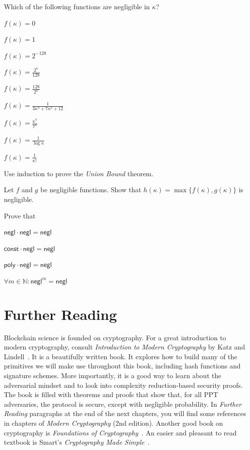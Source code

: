 \begin{problems}
  \item Which of the following functions are negligible in $\kappa$?
    \begin{subproblems}
      \item $f(\kappa) = 0$
      \item $f(\kappa) = 1$
      \item $f(\kappa) = 2^{-128}$
      \item $f(\kappa) = \frac{2^\kappa}{128}$
      \item $f(\kappa) = \frac{128}{2^\kappa}$
      \item $f(\kappa) = \frac{1}{3\kappa^3 + 7\kappa^2 + 12}$
      \item $f(\kappa) = \frac{\kappa^{7}}{7^{\kappa}}$
      \item $f(\kappa) = \frac{1}{\log \kappa}$
      \item $f(\kappa) = \frac{1}{\kappa!}$
    \end{subproblems}
  \item Use induction to prove the \emph{Union Bound} theorem.
  \item Let $f$ and $g$ be negligible functions. Show that $h(\kappa) = \max\{f(\kappa), g(\kappa)\}$
        is negligible.
  \item Prove that
    \begin{subproblems}
      \item $\textsf{negl} \cdot \textsf{negl} = \textsf{negl}$
      \item $\textsf{const} \cdot \textsf{negl} = \textsf{negl}$
      \item $\textsf{poly} \cdot \textsf{negl} = \textsf{negl}$
      \item $\forall m \in \mathbb{N}: \textsf{negl}^m = \textsf{negl}$
    \end{subproblems}
\end{problems}

\section*{Further Reading}

Blockchain science is founded on cryptography. For a great introduction to modern cryptography,
consult \emph{Introduction to Modern Cryptography} by Katz and Lindell~\cite{katz}. It is a beautifully
written book. It explores how to build many of the primitives we will make use throughout this book,
including hash functions and signature schemes. More importantly, it is a good way to learn about the
adversarial mindset and to look into complexity reduction-based security proofs. The book is filled with
theorems and proofs that show that, for all PPT adversaries, the protocol is secure, except with negligible
probability. In \emph{Further Reading} paragraphs at the end of the next chapters, you will find
some references in chapters of \emph{Modern Cryptography} (2nd edition).
Another good book on cryptography is \emph{Foundations of Cryptography}~\cite{foundations1,foundations2}.
An easier and pleasant to read textbook is Smart's \emph{Cryptography Made Simple}~\cite{smart}.

